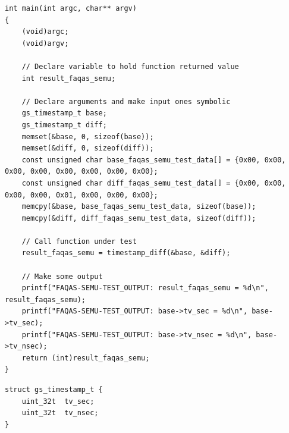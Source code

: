 \begin{lstlisting}[style=CStyle, caption=Test case generated for \UTIL., label=semus:testUtil]
int main(int argc, char** argv)
{
    (void)argc;
    (void)argv;

    // Declare variable to hold function returned value
    int result_faqas_semu;

    // Declare arguments and make input ones symbolic
    gs_timestamp_t base;
    gs_timestamp_t diff;
    memset(&base, 0, sizeof(base));
    memset(&diff, 0, sizeof(diff));
    const unsigned char base_faqas_semu_test_data[] = {0x00, 0x00, 0x00, 0x00, 0x00, 0x00, 0x00, 0x00};
    const unsigned char diff_faqas_semu_test_data[] = {0x00, 0x00, 0x00, 0x00, 0x01, 0x00, 0x00, 0x00};
    memcpy(&base, base_faqas_semu_test_data, sizeof(base));
    memcpy(&diff, diff_faqas_semu_test_data, sizeof(diff));

    // Call function under test
    result_faqas_semu = timestamp_diff(&base, &diff);

    // Make some output
    printf("FAQAS-SEMU-TEST_OUTPUT: result_faqas_semu = %d\n", result_faqas_semu);
    printf("FAQAS-SEMU-TEST_OUTPUT: base->tv_sec = %d\n", base->tv_sec);
    printf("FAQAS-SEMU-TEST_OUTPUT: base->tv_nsec = %d\n", base->tv_nsec);
    return (int)result_faqas_semu;
}
\end{lstlisting}

\begin{lstlisting}[style=CStyle, caption=Definition of \emph{gs\_timestamp\_t} in \UTIL., label=semus:testUtil:struct]
struct gs_timestamp_t {
    uint_32t  tv_sec;
    uint_32t  tv_nsec;
}
\end{lstlisting}

\ENDCHANGEDFINAL
